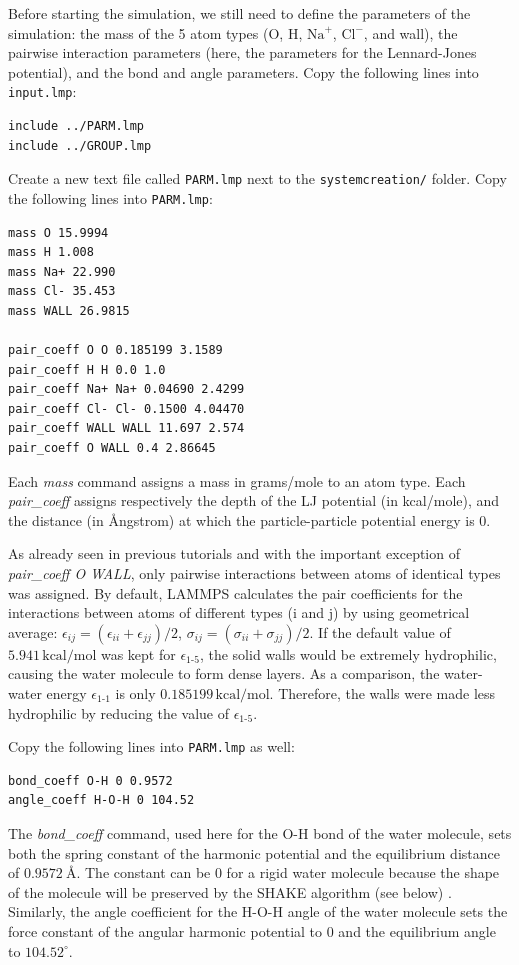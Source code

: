 \documentclass[9pt,tutorial]{livecoms}
\newcommand{\flrcmd}[1]{\textcolor{command}{\texttt{#1}}} %
\newcommand{\flecmd}[1]{\textcolor{command}{\texttt{#1}}} %
\begin{document}
Before starting the simulation, we still need to define the parameters of the
simulation: the mass of the 5 atom types (O, H, $\text{Na}^+$, $\text{Cl}^-$,
and wall), the pairwise interaction parameters (here, the parameters for the
Lennard-Jones potential), and the bond and angle parameters. Copy the following
lines into \flecmd{input.lmp}:
\begin{lstlisting}
include ../PARM.lmp
include ../GROUP.lmp
\end{lstlisting}
Create a new text file called \flecmd{PARM.lmp} next to the \flrcmd{systemcreation/}
folder. Copy the following lines into \flecmd{PARM.lmp}:
\begin{lstlisting}
mass O 15.9994
mass H 1.008
mass Na+ 22.990
mass Cl- 35.453
mass WALL 26.9815

pair_coeff O O 0.185199 3.1589
pair_coeff H H 0.0 1.0
pair_coeff Na+ Na+ 0.04690 2.4299
pair_coeff Cl- Cl- 0.1500 4.04470
pair_coeff WALL WALL 11.697 2.574
pair_coeff O WALL 0.4 2.86645
\end{lstlisting}
Each \textit{mass} command assigns a mass in grams/mole to an atom type.
Each \textit{pair\_coeff} assigns respectively the depth of the LJ potential
(in kcal/mole), and the distance (in Ångstrom) at which the particle-particle
potential energy is 0.

As already seen in previous tutorials and with the important exception of
\textit{pair\_coeff O WALL}, only pairwise interactions between atoms of identical
types was assigned. By default, LAMMPS calculates the pair coefficients for the
interactions between atoms of different types (i and j) by using geometrical average:
$\epsilon_{ij} = (\epsilon_{ii} + \epsilon_{jj})/2$,  $\sigma_{ij} = (\sigma_{ii} + \sigma_{jj})/2$.
If the default value of $5.941\,\text{kcal/mol}$ was kept for $\epsilon_\text{1-5}$, the solid
walls would be extremely hydrophilic, causing the water molecule to form dense layers. As a
comparison, the water-water energy $\epsilon_\text{1-1}$ is only $0.185199\,\text{kcal/mol}$.
Therefore, the walls were made less hydrophilic by reducing the value of $\epsilon_\text{1-5}$.

Copy the following lines into \flecmd{PARM.lmp} as well:
\begin{lstlisting}
bond_coeff O-H 0 0.9572
angle_coeff H-O-H 0 104.52
\end{lstlisting}
The \textit{bond\_coeff} command, used here for the O-H bond of the water
molecule, sets both the spring constant of the harmonic potential and the
equilibrium distance of $0.9572~\text{\AA{}}$. The constant can be 0 for a
rigid water molecule because the shape of the molecule will be preserved by
the SHAKE algorithm (see below) \cite{ryckaert1977numerical, andersen1983rattle}.
Similarly, the angle coefficient for the H-O-H angle of the water molecule sets
the force constant of the angular harmonic potential to 0 and the equilibrium
angle to $104.52^\circ$.
\end{document}
